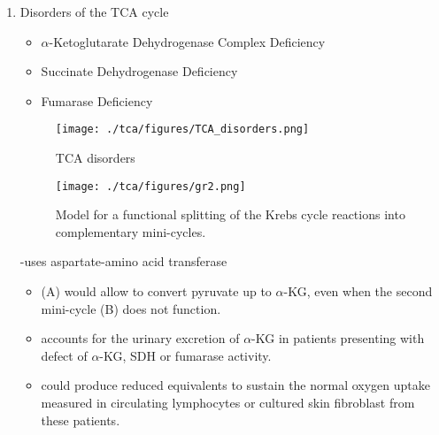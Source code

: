 \documentclass{scrartcl}
\begin{document}
\begin{enumerate}
\item Disorders of the TCA cycle
\label{sec:org20dd6fb}

\begin{itemize}
\item \(\alpha\)-Ketoglutarate Dehydrogenase Complex Deficiency
\item Succinate Dehydrogenase Deficiency
\item Fumarase Deficiency
\end{itemize}

\begin{figure}[htbp]
\centering
\texttt{[image: ./tca/figures/TCA\_disorders.png]}
\caption{\label{fig:org949ae0b}
TCA disorders}
\end{figure}


\begin{figure}[htbp]
\centering
\texttt{[image: ./tca/figures/gr2.png]}
\caption{\label{fig:org39f72d2}
Model for a functional splitting of the Krebs cycle reactions into complementary mini-cycles.}
\end{figure}

-uses aspartate-amino acid transferase
\begin{itemize}
\item (A) would allow to convert pyruvate up to \(\alpha\)-KG, even when the second mini-cycle (B) does not function.
\item accounts for the urinary excretion of \(\alpha\)-KG in patients
presenting with defect of \(\alpha\)-KG, SDH or fumarase activity.
\item could produce reduced equivalents to sustain the normal oxygen
uptake measured in circulating lymphocytes or cultured skin
fibroblast from these patients.
\end{itemize}
\end{enumerate}
\end{document}
